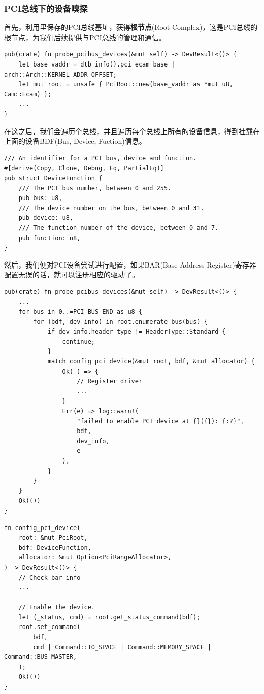 \documentclass{article}
\begin{document}
\subsubsection{PCI总线下的设备嗅探}
首先，利用里保存的PCI总线基址，获得\textbf{根节点}(Root Complex)，这是PCI总线的根节点，为我们后续提供与PCI总线的管理和通信。

\begin{lstlisting}
pub(crate) fn probe_pcibus_devices(&mut self) -> DevResult<()> {
    let base_vaddr = dtb_info().pci_ecam_base | arch::Arch::KERNEL_ADDR_OFFSET;
    let mut root = unsafe { PciRoot::new(base_vaddr as *mut u8, Cam::Ecam) };
    ...
}
\end{lstlisting}

在这之后，我们会遍历个总线，并且遍历每个总线上所有的设备信息，得到挂载在上面的设备BDF(Bus, Device, Fuction)信息。

\begin{lstlisting}
/// An identifier for a PCI bus, device and function.
#[derive(Copy, Clone, Debug, Eq, PartialEq)]
pub struct DeviceFunction {
    /// The PCI bus number, between 0 and 255.
    pub bus: u8,
    /// The device number on the bus, between 0 and 31.
    pub device: u8,
    /// The function number of the device, between 0 and 7.
    pub function: u8,
}
\end{lstlisting}

然后，我们便对PCI设备尝试进行配置，如果BAR(Base Address Register)寄存器配置无误的话，就可以注册相应的驱动了。
\begin{lstlisting}
pub(crate) fn probe_pcibus_devices(&mut self) -> DevResult<()> {
    ...
    for bus in 0..=PCI_BUS_END as u8 {
        for (bdf, dev_info) in root.enumerate_bus(bus) {
            if dev_info.header_type != HeaderType::Standard {
                continue;
            }
            match config_pci_device(&mut root, bdf, &mut allocator) {
                Ok(_) => {
                    // Register driver
                    ...
                }
                Err(e) => log::warn!(
                    "failed to enable PCI device at {}({}): {:?}",
                    bdf,
                    dev_info,
                    e
                ),
            }
        }
    }
    Ok(())
}
\end{lstlisting}

\begin{lstlisting}
fn config_pci_device(
    root: &mut PciRoot,
    bdf: DeviceFunction,
    allocator: &mut Option<PciRangeAllocator>,
) -> DevResult<()> {
    // Check bar info
    ...

    // Enable the device.
    let (_status, cmd) = root.get_status_command(bdf);
    root.set_command(
        bdf,
        cmd | Command::IO_SPACE | Command::MEMORY_SPACE | Command::BUS_MASTER,
    );
    Ok(())
}

\end{lstlisting}
\end{document}
